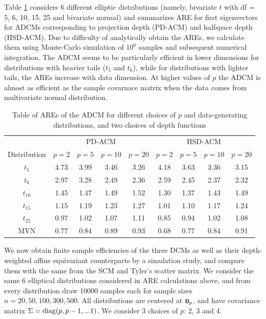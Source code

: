 Table \ref{table:AREtable} considers 6 different elliptic distributions (namely, bivariate $t$ with df = 5, 6, 10, 15, 25 and bivariate normal) and summarizes ARE for first eigenvectors for ADCMs corresponding to projection depth (PD-ACM) and halfspace depth (HSD-ACM). Due to difficulty of analytically obtain the AREs, we calculate them using Monte-Carlo simulation of $10^6$ samples and subsequent numerical integration. The ADCM seems to be particularly efficient in lower dimensions for distributions with heavier tails ($t_5$ and $t_6$), while for distributions with lighter tails, the AREs increase with data dimension. At higher values of $p$ the ADCM is almost as efficient as the sample covarnace matrix when the data comes from multivariate normal distribution.

\begin{table}[t]
\centering
    \begin{tabular}{c|cccc|cccc}
    \hline
    & \multicolumn{4}{c|}{PD-ACM} & \multicolumn{4}{c}{HSD-ACM} \\\cline{2-9}
    Distribution & $p=2$  & $p=5$  & $p=10$ & $p=20$ & $p=2$  & $p=5$  & $p=10$ & $p=20$ \\ \hline
    $t_5$           & 4.73 & 3.99 & 3.46 & 3.26 & 4.18 & 3.63 & 3.36 & 3.15 \\
    $t_6$           & 2.97 & 3.28 & 2.49 & 2.36 & 2.59 & 2.45 & 2.37 & 2.32 \\
    $t_{10}$          & 1.45 & 1.47 & 1.49 & 1.52 & 1.30 & 1.37 & 1.43 & 1.49 \\
    $t_{15}$          & 1.15 & 1.19 & 1.23 & 1.27 & 1.01 & 1.10 & 1.17 & 1.24 \\
    $t_{25}$          & 0.97 & 1.02 & 1.07 & 1.11 & 0.85 & 0.94 & 1.02 & 1.08 \\
    MVN          & 0.77 & 0.84 & 0.89 & 0.93 & 0.68 & 0.77 & 0.84 & 0.91 \\ \hline
    \end{tabular}
    \caption{Table of AREs of the ADCM for different choices of $p$ and data-generating distributions, and two choices of depth functions}
    \label{table:AREtable}
\end{table}

We now obtain finite sample efficiencies of the three DCMs as well as their depth-weighted affine equivariant counterparts by a simulation study, and compare them with the same from the SCM and Tyler's scatter matrix. We consider the same 6 elliptical distributions considered in ARE calculations above, and from every distribution draw 10000 samples each for sample sizes $n = 20, 50, 100, 300, 500$. All distributions are centered at ${\bf 0}_p$, and have covariance matrix $\Sigma = \operatorname*{diag}(p,p-1,...1)$. We consider 3 choices of $p$: 2, 3 and 4.

